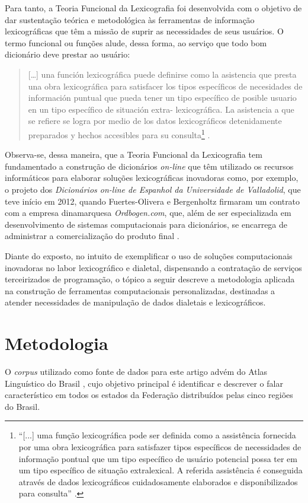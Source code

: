 \documentclass[portuguese]{textolivre}
\begin{document}
Para tanto, a Teoria Funcional da Lexicografia \cite[p. 43]{tarp2008lexicography} foi desenvolvida com o objetivo de dar sustentação teórica e metodológica às ferramentas de informação lexicográficas que têm a missão de suprir as necessidades de seus usuários. O termo funcional ou funções alude, dessa forma, ao serviço que todo bom dicionário deve prestar ao usuário:
\begin{quote}
    [\ldots] una función lexicográfica puede definirse como la asistencia que presta una obra lexicográfica para satisfacer los tipos específicos de necesidades de información puntual que pueda tener un tipo específico de posible usuario en un tipo específico de situación extra- lexicográfica. La asistencia a que se refiere se logra por medio de los datos lexicográficos detenidamente preparados y hechos accesibles para su consulta\footnote{“[...] uma função lexicográfica pode ser definida como a assistência fornecida por uma obra lexicográfica para satisfazer tipos específicos de necessidades de informação pontual que um tipo específico de usuário potencial possa ter em um tipo específico de situação extralexical. A referida assistência é conseguida através de dados lexicográficos cuidadosamente elaborados e disponibilizados para consulta” \cite[p. 36]{tarp2015teoria}.} \cite[p. 26, tradução nossa]{tarp2015teoria}.
\end{quote}

Observa-se, dessa maneira, que a Teoria Funcional da Lexicografia tem fundamentado a construção de dicionários \textit{on-line} que têm utilizado os recursos informáticos para elaborar soluções lexicográficas inovadoras como, por exemplo, o projeto dos \emph{Dicionários \textit{on-line} de Espanhol da Universidade de Valladolid}, que teve início em 2012, quando Fuertes-Olivera e Bergenholtz firmaram um contrato com a empresa dinamarquesa \emph{Ordbogen.com}, que, além de ser especializada em desenvolvimento de sistemas computacionais para dicionários, se encarrega de administrar a comercialização do produto final \cite[p. 73]{fuertes2015}.

Diante do exposto, no intuito de exemplificar o uso de soluções computacionais inovadoras no labor lexicográfico e dialetal, dispensando a contratação de serviços terceirizados de programação, o tópico a seguir descreve a metodologia aplicada na construção de ferramentas computacionais personalizadas, destinadas a atender necessidades de manipulação de dados dialetais e lexicográficos.


\section{Metodologia}
O \emph{corpus} utilizado como fonte de dados para este artigo advém do Atlas Linguístico do Brasil \cite{comite2001}, cujo objetivo principal é identificar e descrever o falar característico em todos os estados da Federação distribuídos pelas cinco regiões do Brasil. 
\end{document}
